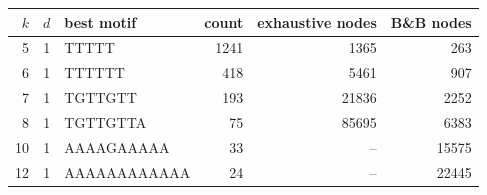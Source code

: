\begin{tabular}{rrlrrr}
\hline
$k$ & $d$ & best motif & count & exhaustive nodes & B\&B nodes \\
\hline
5 & 1 & TTTTT & 1241 & 1365 & 263 \\
6 & 1 & TTTTTT & 418 & 5461 & 907 \\
7 & 1 & TGTTGTT & 193 & 21836 & 2252 \\
8 & 1 & TGTTGTTA & 75 & 85695 & 6383 \\
10 & 1 & AAAAGAAAAA & 33 & -- & 15575 \\
12 & 1 & AAAAAAAAAAAA & 24 & -- & 22445 \\
\hline
\end{tabular}